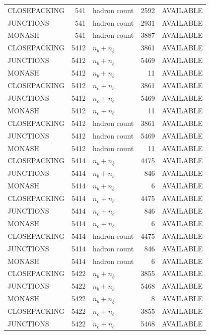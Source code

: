 \begin{landscape}
\begin{longtable}{@{}lrlrl@{}}
CLOSEPACKING & 541 & hadron count & \num{2592} & AVAILABLE \\
JUNCTIONS & 541 & hadron count & \num{2931} & AVAILABLE \\
MONASH & 541 & hadron count & \num{3887} & AVAILABLE \\
CLOSEPACKING & 5412 & $n_b+n_{\bar b}$ & \num{3861} & AVAILABLE \\
JUNCTIONS & 5412 & $n_b+n_{\bar b}$ & \num{5469} & AVAILABLE \\
MONASH & 5412 & $n_b+n_{\bar b}$ & \num{11} & AVAILABLE \\
CLOSEPACKING & 5412 & $n_c+n_{\bar c}$ & \num{3861} & AVAILABLE \\
JUNCTIONS & 5412 & $n_c+n_{\bar c}$ & \num{5469} & AVAILABLE \\
MONASH & 5412 & $n_c+n_{\bar c}$ & \num{11} & AVAILABLE \\
CLOSEPACKING & 5412 & hadron count & \num{3861} & AVAILABLE \\
JUNCTIONS & 5412 & hadron count & \num{5469} & AVAILABLE \\
MONASH & 5412 & hadron count & \num{11} & AVAILABLE \\
CLOSEPACKING & 5414 & $n_b+n_{\bar b}$ & \num{4475} & AVAILABLE \\
JUNCTIONS & 5414 & $n_b+n_{\bar b}$ & \num{846} & AVAILABLE \\
MONASH & 5414 & $n_b+n_{\bar b}$ & \num{6} & AVAILABLE \\
CLOSEPACKING & 5414 & $n_c+n_{\bar c}$ & \num{4475} & AVAILABLE \\
JUNCTIONS & 5414 & $n_c+n_{\bar c}$ & \num{846} & AVAILABLE \\
MONASH & 5414 & $n_c+n_{\bar c}$ & \num{6} & AVAILABLE \\
CLOSEPACKING & 5414 & hadron count & \num{4475} & AVAILABLE \\
JUNCTIONS & 5414 & hadron count & \num{846} & AVAILABLE \\
MONASH & 5414 & hadron count & \num{6} & AVAILABLE \\
CLOSEPACKING & 5422 & $n_b+n_{\bar b}$ & \num{3855} & AVAILABLE \\
JUNCTIONS & 5422 & $n_b+n_{\bar b}$ & \num{5468} & AVAILABLE \\
MONASH & 5422 & $n_b+n_{\bar b}$ & \num{8} & AVAILABLE \\
CLOSEPACKING & 5422 & $n_c+n_{\bar c}$ & \num{3855} & AVAILABLE \\
JUNCTIONS & 5422 & $n_c+n_{\bar c}$ & \num{5468} & AVAILABLE \\

\end{longtable}
\end{landscape}
